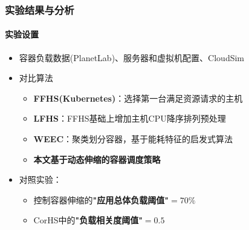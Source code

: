 \begin{frame}
\frametitle{实验结果与分析}
\framesubtitle{实验设置}
\begin{itemize}
    \item 容器负载数据(PlanetLab)、服务器和虚拟机配置、CloudSim
    \item 对比算法
    \begin{itemize}
        \item \textbf{FFHS(Kubernetes)}：选择第一台满足资源请求的主机
        \item \textbf{LFHS}：FFHS基础上增加主机CPU降序排列预处理
        \item \textbf{WEEC}：聚类划分容器，基于能耗特征的启发式算法
        \item \textbf{本文基于动态伸缩的容器调度策略}
    \end{itemize}
    \item 对照实验：
    \begin{itemize}
        \item 控制容器伸缩的\textbf{"应用总体负载阈值"$=70\%$}
        \item CorHS中的\textbf{"负载相关度阈值"$=0.5$}
    \end{itemize}
    \begin{table}[hftb]
        \centering
        \caption{实验对照组设置}
        \label{tab:tab5}
    \end{table}
\end{itemize}
\end{frame}

